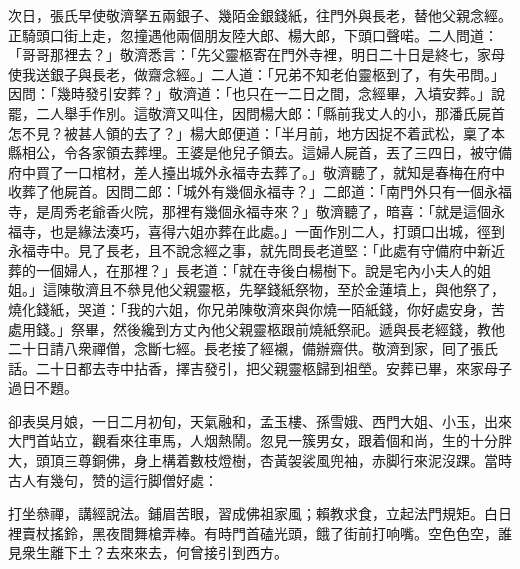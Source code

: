 次日，張氏早使敬濟拏五兩銀子、幾陌金銀錢紙，往門外與長老，替他父親念經。正騎頭口街上走，忽撞遇他兩個朋友陸大郎、楊大郎，下頭口聲喏。二人問道：「哥哥那裡去？」敬濟悉言：「先父靈柩寄在門外寺裡，明日二十日是終七，家母使我送銀子與長老，做齋念經。」二人道：「兄弟不知老伯靈柩到了，有失弔問。」因問：「幾時發引安葬？」敬濟道：「也只在一二日之間，念經畢，入墳安葬。」說罷，二人舉手作別。這敬濟又叫住，因問楊大郎：「縣前我丈人的小，那潘氏屍首怎不見？被甚人領的去了？」楊大郎便道：「半月前，地方因捉不着武松，稟了本縣相公，令各家領去葬埋。王婆是他兒子領去。這婦人屍首，丟了三四日，被守備府中買了一口棺材，差人擡出城外永福寺去葬了。」敬濟聽了，就知是春梅在府中收葬了他屍首。因問二郎：「城外有幾個永福寺？」二郎道：「南門外只有一個永福寺，是周秀老爺香火院，那裡有幾個永福寺來？」敬濟聽了，暗喜：「就是這個永福寺，也是緣法湊巧，喜得六姐亦葬在此處。」一面作別二人，打頭口出城，徑到永福寺中。見了長老，且不說念經之事，就先問長老道堅：「此處有守備府中新近葬的一個婦人，在那裡？」長老道：「就在寺後白楊樹下。說是宅內小夫人的姐姐。」這陳敬濟且不叅見他父親靈柩，{}先拏錢紙祭物，至於金蓮墳上，與他祭了，燒化錢紙，哭道：「我的六姐，你兄弟陳敬濟來與你燒一陌紙錢，你好處安身，苦處用錢。」祭畢，然後纔到方丈內他父親靈柩跟前燒紙祭祀。遞與長老經錢，教他二十日請八衆禪僧，念斷七經。長老接了經襯，備辦齋供。敬濟到家，囘了張氏話。二十日都去寺中拈香，擇吉發引，把父親靈柩歸到祖塋。安葬已畢，來家母子過日不題。

卻表吳月娘，一日二月初旬，天氣融和，孟玉樓、孫雪娥、西門大姐、小玉，出來大門首站立，觀看來往車馬，人烟熱鬧。忽見一簇男女，跟着個和尚，生的十分胖大，頭頂三尊銅佛，身上構着數枝燈樹，杏黃袈裟風兜袖，赤脚行來泥沒踝。當時古人有幾句，赞的這行脚僧好處：

\begin{myquote}
打坐叅禪，講經說法。鋪眉苦眼，習成佛祖家風；賴教求食，立起法門規矩。白日裡賣杖搖鈴，黑夜間舞槍弄棒。有時門首磕光頭，餓了街前打响嘴。空色色空，誰見衆生離下土？去來來去，何曾接引到西方。
\end{myquote}

